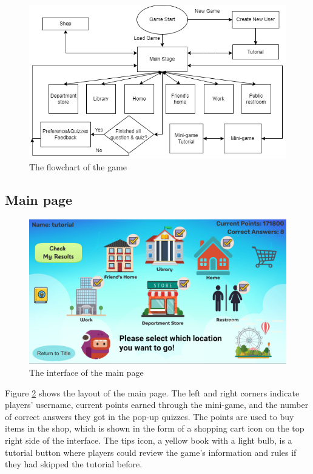 \documentclass[msc,deptreport,ai]{infthesis}      %
\begin{document}
\begin{figure}
    \centering
    \includegraphics[scale=0.6]{Game Flowchart2.png}
    \caption{The flowchart of the game}
    \label{fig:flowchart}
\end{figure}

\subsection{Main page}
\label{section:main page}

\begin{figure}
    \centering
    \includegraphics[scale=0.23]{Main Stage.png}
    \caption{The interface of the main page}
    \label{fig:main}
\end{figure}

Figure \ref{fig:main} shows the layout of the main page. The left and right corners indicate players' username, current points earned through the mini-game, and the number of correct answers they got in the pop-up quizzes. The points are used to buy items in the shop, which is shown in the form of a shopping cart icon on the top right side of the interface. The tips icon, a yellow book with a light bulb, is a tutorial button where players could review the game's information and rules if they had skipped the tutorial before.
\end{document}
